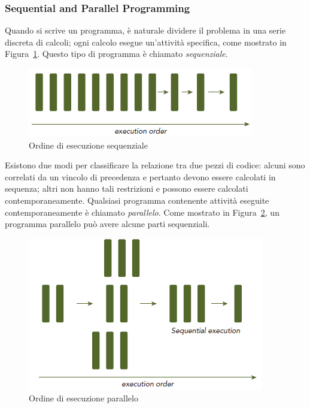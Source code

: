 \subsubsection{Sequential and Parallel Programming}
Quando si scrive un programma, è naturale dividere il problema in una serie discreta di calcoli; ogni calcolo esegue un'attività specifica, come mostrato in Figura~\ref{fig:Execution_order_sequential}. Questo tipo di programma è chiamato \emph{sequenziale}.
\begin{figure}[h!]
	\centering
	\includegraphics[width=.5\textwidth]{Immagini/CUDA/Execution_order_sequential}
	\caption{Ordine di esecuzione sequenziale \cite{Cheng:ProfessionalCudaProgramming}}
	\label{fig:Execution_order_sequential}
\end{figure}
Esistono due modi per classificare la relazione tra due pezzi di codice: alcuni sono
correlati da un vincolo di precedenza e pertanto devono essere calcolati in sequenza; altri non hanno tali restrizioni e possono essere calcolati contemporaneamente. Qualsiasi programma contenente attività eseguite contemporaneamente è chiamato \emph{parallelo}. Come mostrato in Figura~\ref{fig:Execution_order_parallel}, un programma parallelo può avere alcune parti sequenziali.
\begin{figure}[H]
	\centering
	\includegraphics[width=.5\textwidth]{Immagini/CUDA/Execution_order_parallel}
	\caption{Ordine di esecuzione parallelo \cite{Cheng:ProfessionalCudaProgramming}}
	\label{fig:Execution_order_parallel}
\end{figure}
